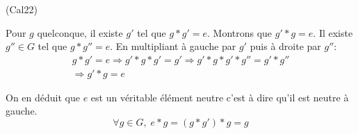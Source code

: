 \begin{tiny}(Cal22)\end{tiny} Pour $g$ quelconque, il existe $g'$ tel que $g*g'=e$. Montrons que $g'*g=e$.\newline
Il existe $g''\in G$ tel que $g*g''=e$. En multipliant à gauche par $g'$ puis à droite par $g''$:
\begin{multline*}
g*g' = e \Rightarrow g'*g*g'=g'
\Rightarrow g' * g * g' * g'' = g' * g'' \\
\Rightarrow g' * g = e
\end{multline*}

On en déduit que $e$ est un véritable élément neutre c'est à dire qu'il est neutre à gauche.
\begin{displaymath}
\forall g\in G,\;
e*g = (g*g')*g = g
\end{displaymath}
